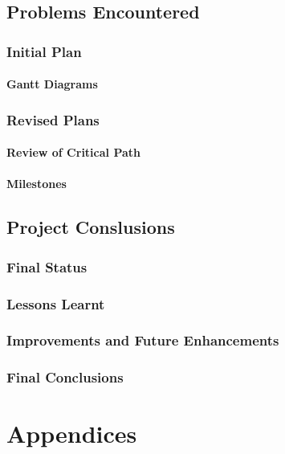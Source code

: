 \documentclass[a4paper,12pt]{book}
\begin{document}
\chapter{Problems Encountered}

\section{Initial Plan}

\subsection{Gantt Diagrams}

\section{Revised Plans}

\subsection{Review of Critical Path}

\subsection{Milestones}


\chapter{Project Conslusions}

\section{Final Status}

\section{Lessons Learnt}

\section{Improvements and Future Enhancements}

\section{Final Conclusions}

\part*{Appendices}
\end{document}

